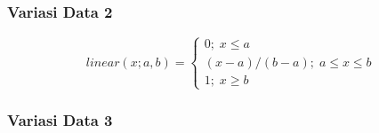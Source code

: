 \subsubsection{Variasi Data 2}
\lipsum[1]

\begin{equation}
	\label{eq liniernaik}
	linear(x; a,b) =
	\left\{\begin{matrix}
		0; \; x \leq a\\ 
		(x-a)/(b-a); \; a \leq x \leq b\\ 
		1; \; x \geq b
	\end{matrix}\right.
\end{equation}

\subsubsection{Variasi Data 3}
\lipsum[1]

